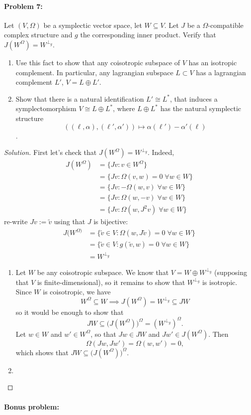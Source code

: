 \paragraph{Problem 7:} Let $(V,\Omega)$ be a symplectic vector space, let $W\subseteq V$. Let $J$ be a $\Omega$-compatible complex structure and $g$ the corresponding inner product. Verify that $J(W^{\Omega} )=W^{\perp_{g}}$.
\begin{enumerate}[label=\alph*.]
	\item Use this fact to show that any coisotropic subspace of $V$ has an isotropic complement. In particular, any lagrangian subspace $L\subset V$ has a lagrangian complement $L'$, $V=L\oplus L'$.
	
\item Show that there is a natural identification $L'\cong L^{*}$, that induces a symplectomorphism $V\cong L\oplus L^{*}$, where $L\oplus L^{*}$ has the natural symplectic structure \[\left( (\ell,\alpha),(\ell',\alpha') \right)\longmapsto\alpha(\ell')-\alpha'(\ell)\].
\end{enumerate}

\begin{proof}[Solution]\leavevmode
	First let's check that $J(W^{\Omega} )=W^{\perp_{g}}$. Indeed,
	\begin{align*}
		J(W^{\Omega} )&= \{Jv:v\in W^{\Omega}\}\\
&=\{Jv:\Omega(v,w)=0\;\forall w\in W\} \\
&=\{Jv:-\Omega(w,v)\;\forall w\in W\} \\
&=\{Jv:\Omega(w,-v)\;\forall w\in W\} \\
&=\{Jv:\Omega(w,J^{2}v)\;\forall w\in W\}
	\end{align*}
re-write $Jv:=\tilde{v}$ using that $J$ is bijective:
	\begin{align*}
J(W^{\Omega)}&=\{\tilde{v}\in V:\Omega(w,J\tilde{v})=0\;\forall w\in W\} \\
&=\{ \tilde{v}\in V:g(\tilde{v},w)=0\;\forall w\in W\} \\
& =W^{\perp_{g}}
	\end{align*}
	\begin{enumerate}[label=\alph*.]
		\item Let $W$ be any coisotropic subspace. We know that $V=W\oplus W^{\perp_g}$ (supposing that $V$ is finite-dimensional), so it remains to show that $W^{\perp_g}$ is isotropic.
		Since $W$ is coisotropic, we have
		\[W^{\Omega}\subseteq W\implies J(W^{\Omega})=W^{\perp_g}\subseteq JW\]
		so it would be enough to show that
		\[JW\subseteq\big(J(W^{\Omega})\big)^{\Omega}=(W^{\perp_g})^{\Omega}.\]
		Let $w\in W$ and $w'\in W^{\Omega}$, so that $Jw\in JW$ and $Jw'\in J(W^{\Omega})$. Then
		\[\Omega(Jw,Jw')=\Omega(w,w')=0,\]
		which shows that $JW\subseteq\big(J(W^{\Omega})\big)^{\Omega}$.

		\item
	\end{enumerate}


\end{proof}

\paragraph{Bonus problem: } 


